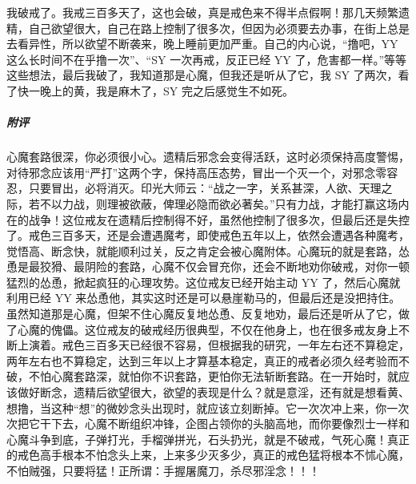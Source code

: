 \begin{case}
    我破戒了。我戒三百多天了，这也会破，真是戒色来不得半点假啊！那几天频繁遗精，自己欲望很大，自己在路上控制了很多次，但因为必须要去办事，在街上总是去看异性，所以欲望不断袭来，晚上睡前更加严重。自己的内心说，“撸吧，YY 这么长时间不在乎撸一次”、“SY 一次再戒，反正已经 YY 了，危害都一样。”等等这些想法，最后我破了，我知道那是心魔，但我还是听从了它，我 SY 了两次，看了快一晚上的黄，我是麻木了，SY 完之后感觉生不如死。
    \subparagraph{附评} 心魔套路很深，你必须很小心。遗精后邪念会变得活跃，这时必须保持高度警惕，对待邪念应该用“严打”这两个字，保持高压态势，冒出一个灭一个，对邪念零容忍，只要冒出，必将消灭。印光大师云：“战之一字，关系甚深，人欲、天理之际，若不以力战，则理被欲蔽，俾理必隐而欲必著矣。”只有力战，才能打赢这场内在的战争！这位戒友在遗精后控制得不好，虽然他控制了很多次，但最后还是失控了。戒色三百多天，还是会遭遇魔考，即使戒色五年以上，依然会遭遇各种魔考，觉悟高、断念快，就能顺利过关，反之肯定会被心魔附体。心魔玩的就是套路，怂恿是最狡猾、最阴险的套路，心魔不仅会冒充你，还会不断地劝你破戒，对你一顿猛烈的怂恿，掀起疯狂的心理攻势。这位戒友已经开始主动 YY 了，然后心魔就利用已经 YY 来怂恿他，其实这时还是可以悬崖勒马的，但最后还是没把持住。虽然知道那是心魔，但架不住心魔反复地怂恿、反复地劝，最后还是听从了它，做了心魔的傀儡。这位戒友的破戒经历很典型，不仅在他身上，也在很多戒友身上不断上演着。戒色三百多天已经很不容易，但根据我的研究，一年左右还不算稳定，两年左右也不算稳定，达到三年以上才算基本稳定，真正的戒者必须久经考验而不破，不怕心魔套路深，就怕你不识套路，更怕你无法斩断套路。在一开始时，就应该做好断念，遗精后欲望很大，欲望的表现是什么？就是意淫，还有就是想看黄、想撸，当这种“想”的微妙念头出现时，就应该立刻断掉。它一次次冲上来，你一次次把它干下去，心魔不断组织冲锋，企图占领你的头脑高地，而你要像烈士一样和心魔斗争到底，子弹打光，手榴弹拼光，石头扔光，就是不破戒，气死心魔！真正的戒色高手根本不怕念头上来，上来多少灭多少，真正的戒色猛将根本不怵心魔，不怕贼强，只要将猛！正所谓：手握屠魔刀，杀尽邪淫念！！！
\end{case}

